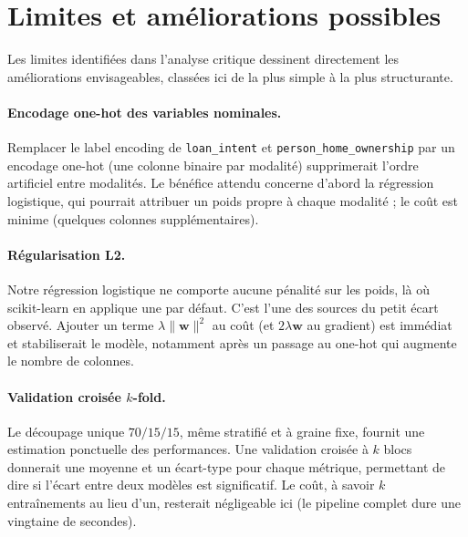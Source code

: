 
\section{Limites et améliorations possibles}
\label{sec:limites}

Les limites identifiées dans l'analyse critique dessinent directement les
améliorations envisageables, classées ici de la plus simple à la plus
structurante.

\paragraph{Encodage one-hot des variables nominales.}
Remplacer le label encoding de \texttt{loan\_intent} et
\texttt{person\_home\_ownership} par un encodage one-hot (une colonne binaire
par modalité) supprimerait l'ordre artificiel entre modalités. Le bénéfice
attendu concerne d'abord la régression logistique, qui pourrait attribuer un
poids propre à chaque modalité ; le coût est minime (quelques colonnes
supplémentaires).

\paragraph{Régularisation L2.}
Notre régression logistique ne comporte aucune pénalité sur les poids, là où
scikit-learn en applique une par défaut. C'est l'une des sources du petit
écart observé. Ajouter un terme $\lambda \lVert \mathbf{w} \rVert^2$ au coût
(et $2\lambda\mathbf{w}$ au gradient) est immédiat et stabiliserait le modèle,
notamment après un passage au one-hot qui augmente le nombre de colonnes.

\paragraph{Validation croisée $k$-fold.}
Le découpage unique $70/15/15$, même stratifié et à graine fixe, fournit une
estimation ponctuelle des performances. Une validation croisée à $k$ blocs
donnerait une moyenne et un écart-type pour chaque métrique, permettant de dire
si l'écart entre deux modèles est significatif. Le coût, à savoir $k$
entraînements au lieu d'un, resterait négligeable ici (le pipeline complet dure
une vingtaine de secondes).

